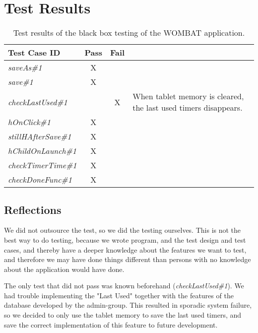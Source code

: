 \section{Test Results}
	
	\begin{table}[width=\textwidth]
		\begin{center}
			\begin{tabular}{|l|c|c|p{6cm}|}
				\hline
				\textbf{Test Case ID} & \textbf{Pass} & \textbf{Fail} & \textbf{} \\
				\hline
				\textit{saveAs\#1} & X &  &  \\
				\hline
				\textit{save\#1} & X &  &  \\
				\hline
				\textit{checkLastUsed\#1} &  & X & When tablet memory is cleared, the last used timers disappears. \\
				\hline
				\textit{hOnClick\#1} & X &  &  \\
				\hline
				\textit{stillHAfterSave\#1} & X &  &  \\
				\hline
				\textit{hChildOnLaunch\#1} & X &  &  \\
				\hline
				\textit{checkTimerTime\#1} & X &  &  \\
				\hline
				\textit{checkDoneFunc\#1} & X &  &  \\
				\hline
			\end{tabular}
			\caption{Test results of the black box testing of the WOMBAT application.}
			\label{tab:bb_test_results}
		\end{center}
	\end{table}

\subsection{Reflections}
We did not outsource the test, so we did the testing ourselves. This is not the best way to do testing, because we wrote program, and the test design and test cases, and thereby have a deeper knowledge about the features we want to test, and therefore we may have done things different than persons with no knowledge about the application would have done.

The only test that did not pass was known beforehand (\textit{checkLastUsed\#1}). We had trouble implementing the "Last Used" together with the features of the database developed by the admin-group. This resulted in sporadic system failure, so we decided to only use the tablet memory to save the last used timers, and save the correct implementation of this feature to future development.